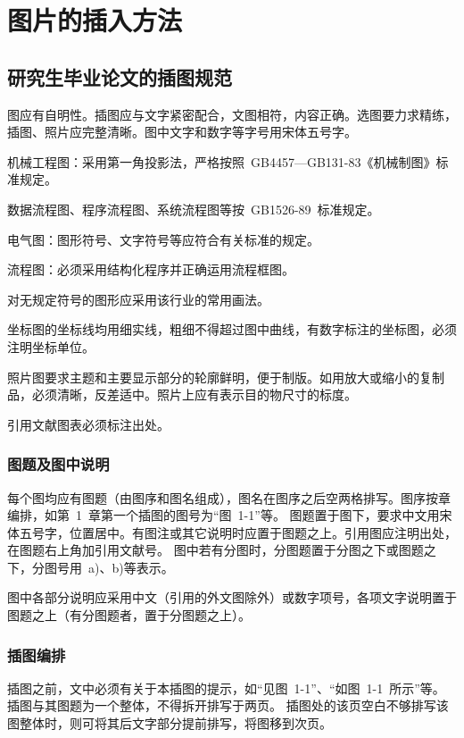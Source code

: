 
\chapter{图片的插入方法}

\section{研究生毕业论文的插图规范}

图应有自明性。插图应与文字紧密配合，文图相符，内容正确。选图要力求精练，插图、照片应完整清晰。图中文字和数字等字号用宋体五号字。

机械工程图：采用第一角投影法，严格按照~GB4457---GB131-83《机械制图》标准规定。

数据流程图、程序流程图、系统流程图等按~GB1526-89~标准规定。

电气图：图形符号、文字符号等应符合有关标准的规定。

流程图：必须采用结构化程序并正确运用流程框图。

对无规定符号的图形应采用该行业的常用画法。

坐标图的坐标线均用细实线，粗细不得超过图中曲线，有数字标注的坐标图，必须注明坐标单位。

照片图要求主题和主要显示部分的轮廓鲜明，便于制版。如用放大或缩小的复制品，必须清晰，反差适中。照片上应有表示目的物尺寸的标度。

引用文献图表必须标注出处。

\subsection{图题及图中说明}
每个图均应有图题（由图序和图名组成），图名在图序之后空两格排写。图序按章编排，如第~1~章第一个插图的图号为“图~1-1”等。
图题置于图下，要求中文用宋体五号字，位置居中。有图注或其它说明时应置于图题之上。引用图应注明出处，在图题右上角加引用文献号。
图中若有分图时，分图题置于分图之下或图题之下，分图号用~a)、b)等表示。

图中各部分说明应采用中文（引用的外文图除外）或数字项号，各项文字说明置于图题之上（有分图题者，置于分图题之上）。

\subsection{插图编排}
插图之前，文中必须有关于本插图的提示，如“见图~1-1”、“如图~1-1~所示”等。插图与其图题为一个整体，不得拆开排写于两页。
插图处的该页空白不够排写该图整体时，则可将其后文字部分提前排写，将图移到次页。

